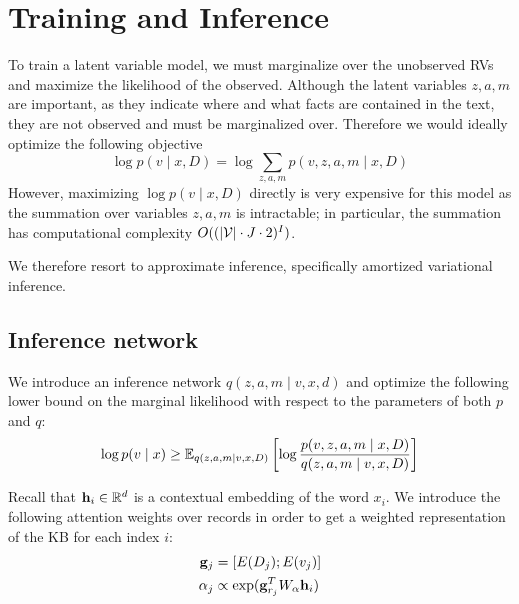 \documentclass[12pt]{article}
\begin{document}
\section{Training and Inference}
To train a latent variable model, we must marginalize over the unobserved RVs
and maximize the likelihood of the observed.
Although the latent variables $z,a,m$ are important, as they indicate
where and what facts are contained in the text, they are not observed
and must be marginalized over.
Therefore we would ideally optimize the following objective
\begin{equation}
\log p(v \mid x,D) = \log \sum_{z,a,m} p(v,z,a,m \mid x,D)
\end{equation}
However, maximizing $\log p(v \mid x,D)$ directly is very expensive for this model
as the summation over variables $z,a,m$ is intractable;
in particular,
the summation has computational complexity $O((|\mathcal{V}|\cdot J\cdot 2)^{I})$.

We therefore resort to approximate inference,
specifically amortized variational inference.

\subsection{Inference network}
We introduce an inference network $q(z,a,m\mid v,x,d)$
and optimize the following lower bound on the marginal likelihood
with respect to the parameters of both $p$ and $q$:
\begin{equation}
\label{eqn:lowerbound}
\log p(v\mid x) \geq
\mathbb{E}_{q(z,a,m\mid v,x,D)}\left[\log \frac{p(v,z,a,m\mid x,D)}{q(z,a,m\mid v,x,D)}\right]
\end{equation}

Recall that $\mathbf{h}_i \in \mathbb{R}^d$ is a contextual embedding of the word $x_i$.
We introduce the following attention weights over records
in order to get a weighted representation
of the KB for each index $i$:
\begin{align}
\mathbf{g}_j &= [E(D_j); E(v_j)]\\
\alpha_j &\propto \exp(\mathbf{g}_{r_j}^T W_\alpha \mathbf{h}_i)
\end{align}
\end{document}
